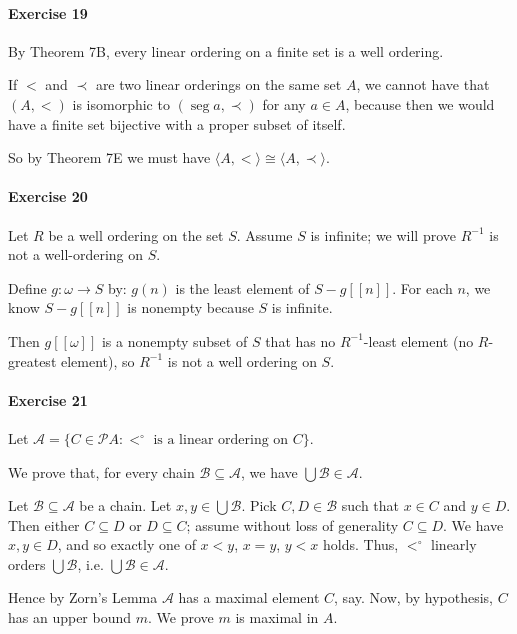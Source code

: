 \documentclass{report}
\newcommand{\inv}[1]{\ensuremath{{#1}^{-1}}}
\newcommand{\seg}{\ensuremath{\operatorname{seg}}}
\begin{document}
    \paragraph{Exercise 19}
    By Theorem 7B, every linear ordering on a finite set is a well ordering.

    If $<$ and $\prec$ are two linear orderings on the same set $A$, we cannot have that
    $(A, <)$ is isomorphic to $(\seg a, \prec)$ for any $a \in A$, because then we would have a finite set
    bijective with a proper subset of itself.

    So by Theorem 7E we must have $\langle A, < \rangle \cong \langle A, \prec \rangle$.

    \paragraph{Exercise 20}
    Let $R$ be a well ordering on the set $S$.  Assume $S$ is infinite; we will prove $\inv{R}$ is not
    a well-ordering on $S$.

    Define $g : \omega \rightarrow S$ by: $g(n)$ is the least element of $S - g[\![n]\!]$. For each $n$,
    we know $S - g[\![n]\!]$ is nonempty because $S$ is infinite.

    Then $g[\![\omega]\!]$ is a nonempty subset of $S$ that has no $\inv{R}$-least element (no $R$-greatest
    element), so $\inv{R}$ is not a well ordering on $S$.

    \paragraph{Exercise 21}
    Let $\mathcal{A} = \{ C \in \mathcal{P} A : <^\circ \text{ is a linear ordering on } C \}$.

    We prove that, for every chain $\mathcal{B} \subseteq \mathcal{A}$, we have $\bigcup \mathcal{B} \in
    \mathcal{A}$.

    Let $\mathcal{B} \subseteq \mathcal{A}$ be a chain. Let $x, y \in \bigcup \mathcal{B}$. Pick $C, D \in
    \mathcal{B}$ such that $x \in C$ and $y \in D$. Then either $C \subseteq D$ or $D \subseteq C$;
    assume without loss of generality $C \subseteq D$. We have $x,y \in D$, and so exactly one of $x < y$, $x = y$, $y < x$ holds.
    Thus, $<^\circ$ linearly orders $\bigcup \mathcal{B}$, i.e. $\bigcup \mathcal{B} \in \mathcal{A}$.

    Hence by Zorn's Lemma $\mathcal{A}$ has a maximal element $C$, say. Now, by hypothesis, $C$ has an upper bound
    $m$. We prove $m$ is maximal in $A$.
\end{document}
